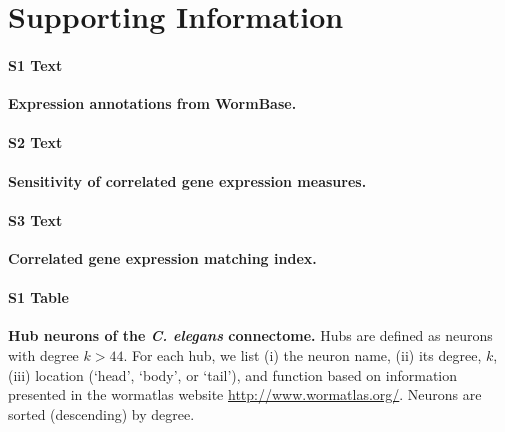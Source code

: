 \documentclass[10pt,letterpaper]{article}
\begin{document}
{%




\newpage
\section*{Supporting Information}
\setcounter{figure}{0} \renewcommand{\thefigure}{S\arabic{figure}}
\renewcommand{\thefigure}{S\arabic{figure}}
\renewcommand{\thetable}{S\arabic{table}}

\paragraph*{S1 Text}
\label{text:expressionAnnotations}
{\bf Expression annotations from WormBase.} 

\paragraph*{S2 Text}
\label{text:coexprSensitivity}
{\bf Sensitivity of correlated gene expression measures.} 

\paragraph*{S3 Text}
\label{text:matchingIndex}
{\bf Correlated gene expression matching index.} 


\clearpage

\paragraph*{S1 Table}
\label{tab:HubList}
{\bf Hub neurons of the \textit{C. elegans} connectome.} Hubs are defined as neurons with degree $k > 44$.
For each hub, we list (i) the neuron name, (ii) its degree, $k$, (iii) location (`head', `body', or `tail'), and function based on information presented in the wormatlas website \url{http://www.wormatlas.org/}.
Neurons are sorted (descending) by degree.}
\end{document}

